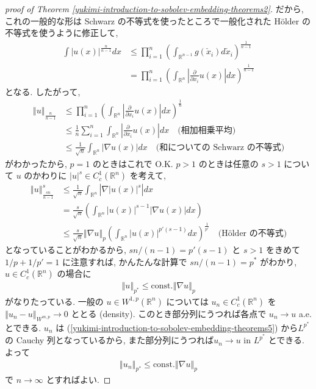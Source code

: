 \documentclass[openany, a4paper, oneside]{jsbook}
\newcommand{\const}{\mathrm{const.}}
\theoremstyle{break}
\theoremstyle{breakdefn}
\newcommand{\abs}[1]{\left|#1\right|}
\newcommand{\norm}[1]{\left\Vert#1\right\Vert}
\newcommand{\rbk}[1]{\left (#1\right)}
\newcommand{\bbR}{\mathbb{R}}
\newcommand{\bbRn}{\mathbb{R}^n}
\begin{document}
\begin{proof}[proof of Theorem \ref{yukimi-introduction-to-sobolev-embedding-theorems2}]
だから, これの一般的な形は Schwarz の不等式を使ったところで一般化された H\"older の不等式を使うように修正して,
\begin{align}
 \int \abs{u(x)}^{\frac{n}{n-1}}dx
 &\le
 \prod_{i=1}^n \rbk{\int_{\bbR^{n-1}} g(\check{x}_i) d \check{x}_i}^{\frac{1}{n-1}} \\
 &=
 \prod_{i=1}^n \rbk{\int_{\bbR^{n}} \abs{\frac{\partial}{\partial x_i} u (x)} dx}^{\frac{1}{n-1}}
\end{align}
となる.
したがって,
\begin{align}
 \norm{u}_{\frac{n}{n-1}}
 &\le
 \prod_{i=1}^n \rbk{\int_{\bbR^{n}} \abs{\frac{\partial}{\partial x_i} u (x)} dx}^{\frac{1}{n}} \\
 &\le
 \frac{1}{n} \sum_{i=1}^n \int_{\bbR^{n}} \abs{\frac{\partial}{\partial x_i} u(x)} dx \quad \text{(相加相乗平均)} \\
 &\le
 \frac{1}{\sqrt{n}} \int_{\bbR^{n}} \abs{\nabla u(x)} dx \quad \text{(和についての Schwarz の不等式)}
\end{align}
がわかったから, $p=1$ のときはこれで O.K.
$p>1$ のときは任意の $s>1$ について $u$ のかわりに $\abs{u}^s \in C_c^1 (\bbR^n)$ を考えて,
\begin{align}\label{yukimi-introduction-to-sobolev-embedding-theorems4}
 \norm{u}_{\frac{sn}{n-1}}^s
 &\le
 \frac{1}{\sqrt{n}} \int_{\bbR^{n}} \abs{\nabla \abs{u(x)}^s} dx \\
 &=
 \frac{s}{\sqrt{n}} \rbk{\int_{\bbR^{n}} \abs{u (x)}^{s-1} \abs{\nabla u(x)} dx} \\
 &\le
 \frac{s}{\sqrt{n}} \norm{\nabla u}_{p} \rbk{\int_{\bbRn} \abs{u(x)}^{p'(s-1)}dx}^{\frac{1}{p'}} \quad \text{(H\"older の不等式)}
\end{align}
となっていることがわかるから,
$sn/ (n-1) = p'(s-1)$ と $s>1$ をきめて $1/p + 1/{p'} = 1$ に注意すれば,
かんたんな計算で $sn/ (n-1) = p^*$ がわかり,
$u \in C_c^1 (\bbR^n)$ の場合に
\begin{align}\label{yukimi-introduction-to-sobolev-embedding-theorems5}
 \norm{u}_{p^*}
 \le
 \const \norm{\nabla u}_p
\end{align}
がなりたっている.
一般の $u \in W^{1, p}(\bbR^n)$ については
$u_n \in C_c^1 (\bbR^n)$ を $\norm{u_n - u}_{W^{m, p}} \to 0$ ととる (density).
このとき部分列にうつれば各点で $u_n \to u$ a.e. とできる.
$u_n$ は (\ref{yukimi-introduction-to-sobolev-embedding-theorems5}) から$L^{p^*}$の Cauchy 列となっているから,
また部分列にうつれば$u_n \to u$ in $L^{p^*}$ とできる.
よって
\begin{align}
 \norm{u_n}_{p^*}
 \leq
 \const \norm{\nabla u}_p
\end{align}
で $n \to \infty$ とすればよい.
\end{proof}
\end{document}
